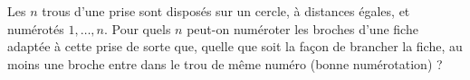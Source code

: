 Les $n$ trous d'une prise sont disposés sur un cercle, à distances égales, et numérotés $1, \ldots, n$. Pour quels $n$ peut-on numéroter les broches d'une fiche adaptée à cette prise de sorte que, quelle que soit la façon de brancher la fiche, au moins une broche entre dans le trou de même numéro (bonne numérotation) ?
